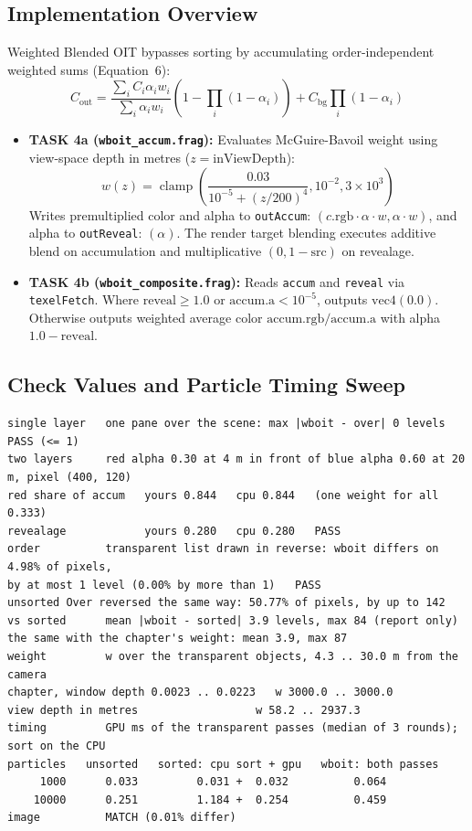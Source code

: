 \documentclass[10pt,a4paper]{article}
\begin{document}
\subsection{Implementation Overview}
Weighted Blended OIT bypasses sorting by accumulating order-independent weighted sums (Equation~6):
\[
C_{\text{out}} = \frac{\sum_i C_i \alpha_i w_i}{\sum_i \alpha_i w_i}\left(1 - \prod_i(1 - \alpha_i)\right) + C_{\text{bg}}\prod_i(1 - \alpha_i)
\]
\begin{itemize}
    \item \textbf{TASK 4a (\texttt{wboit\_accum.frag}):} Evaluates McGuire-Bavoil weight using view-space depth in metres ($z = \text{inViewDepth}$):
    \[
    w(z) = \operatorname{clamp}\left(\frac{0.03}{10^{-5} + (z/200)^4}, 10^{-2}, 3 \times 10^3\right)
    \]
    Writes premultiplied color and alpha to \texttt{outAccum}: $(c.\text{rgb} \cdot \alpha \cdot w, \alpha \cdot w)$, and alpha to \texttt{outReveal}: $(\alpha)$. The render target blending executes additive blend on accumulation and multiplicative $(0, 1 - \text{src})$ on revealage.
    \item \textbf{TASK 4b (\texttt{wboit\_composite.frag}):} Reads \texttt{accum} and \texttt{reveal} via \texttt{texelFetch}. Where $\text{reveal} \ge 1.0$ or $\text{accum.a} < 10^{-5}$, outputs $\text{vec4}(0.0)$. Otherwise outputs weighted average color $\text{accum.rgb} / \text{accum.a}$ with alpha $1.0 - \text{reveal}$.
\end{itemize}

\subsection{Check Values and Particle Timing Sweep}
\begin{lstlisting}[caption={Automated Verification Output for Part IV (make oit)}]
single layer   one pane over the scene: max |wboit - over| 0 levels   PASS (<= 1)
two layers     red alpha 0.30 at 4 m in front of blue alpha 0.60 at 20 m, pixel (400, 120)
red share of accum   yours 0.844   cpu 0.844   (one weight for all 0.333)
revealage            yours 0.280   cpu 0.280   PASS
order          transparent list drawn in reverse: wboit differs on 4.98% of pixels,
by at most 1 level (0.00% by more than 1)   PASS
unsorted Over reversed the same way: 50.77% of pixels, by up to 142
vs sorted      mean |wboit - sorted| 3.9 levels, max 84 (report only)
the same with the chapter's weight: mean 3.9, max 87
weight         w over the transparent objects, 4.3 .. 30.0 m from the camera
chapter, window depth 0.0023 .. 0.0223   w 3000.0 .. 3000.0
view depth in metres                  w 58.2 .. 2937.3
timing         GPU ms of the transparent passes (median of 3 rounds); sort on the CPU
particles   unsorted   sorted: cpu sort + gpu   wboit: both passes
     1000      0.033         0.031 +  0.032          0.064
    10000      0.251         1.184 +  0.254          0.459
image          MATCH (0.01% differ)
\end{lstlisting}
\end{document}

